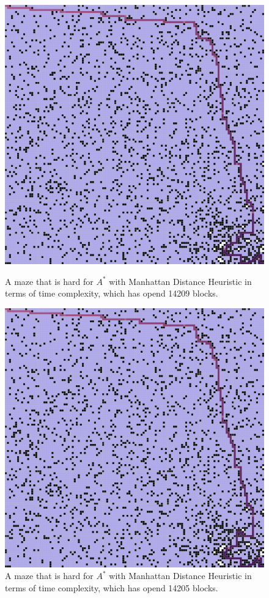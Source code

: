 \documentclass[letter]{article}
\begin{document}
\begin{enumerate}[resume]
\begin{enumerate}
\begin{enumerate}
\begin{figure}
					\includegraphics[width=\textwidth]{../pics/amb/14209.png}
					\caption{\label{fig:amb2}A maze that is hard for $ A^* $ with Manhattan Distance Heuristic in terms of time complexity, which has opend 14209 blocks.}
					\endminipage\hfill
					\includegraphics[width=\textwidth]{../pics/amb/14205.png}
					\caption{\label{fig:amb3} A maze that is hard for $ A^* $ with Manhattan Distance Heuristic in terms of time complexity, which has opend 14205 blocks.}
					\endminipage
					\endminipage 
				\end{figure}
				

\end{enumerate}
\end{enumerate}
\end{enumerate}
\end{document}
